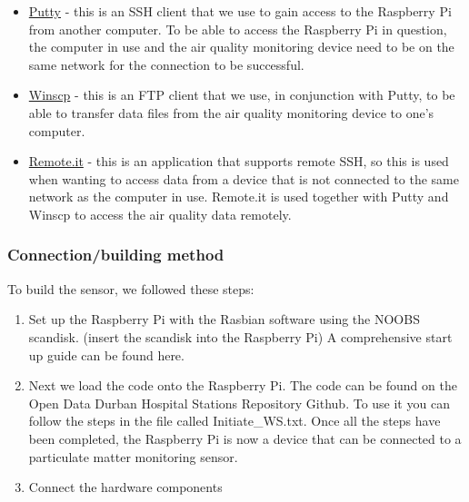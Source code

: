 \documentclass[
  authoryear,
  review,
  3p]{elsarticle}
\providecommand{\tightlist}{%
  \setlength{\itemsep}{0pt}\setlength{\parskip}{0pt}}\usepackage{longtable,booktabs,array}
\begin{document}
\begin{itemize}
\tightlist
\item
  \href{https://www.putty.org/}{Putty} - this is an SSH client that we
  use to gain access to the Raspberry Pi from another computer. To be
  able to access the Raspberry Pi in question, the computer in use and
  the air quality monitoring device need to be on the same network for
  the connection to be successful.
\item
  \href{https://winscp.net/eng/download.php}{Winscp} - this is an FTP
  client that we use, in conjunction with Putty, to be able to transfer
  data files from the air quality monitoring device to one's computer.
\item
  \href{https://app.remote.it/}{Remote.it} - this is an application that
  supports remote SSH, so this is used when wanting to access data from
  a device that is not connected to the same network as the computer in
  use. Remote.it is used together with Putty and Winscp to access the
  air quality data remotely.
\end{itemize}

\hypertarget{connectionbuilding-method}{%
\subsubsection*{Connection/building
method}\label{connectionbuilding-method}}

To build the sensor, we followed these steps:

\begin{enumerate}
\def\labelenumi{\arabic{enumi}.}
\tightlist
\item
  Set up the Raspberry Pi with the Rasbian software using the NOOBS
  scandisk. (insert the scandisk into the Raspberry Pi) A comprehensive
  start up guide can be found here.
\item
  Next we load the code onto the Raspberry Pi. The code can be found on
  the Open Data Durban Hospital Stations Repository Github. To use it
  you can follow the steps in the file called Initiate\_WS.txt. Once all
  the steps have been completed, the Raspberry Pi is now a device that
  can be connected to a particulate matter monitoring sensor.\\
\item
  Connect the hardware components
\end{enumerate}
\end{document}

